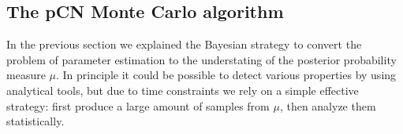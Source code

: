 \documentclass[8pt]{article}
\begin{document}

\subsection{The pCN Monte Carlo algorithm}
In the previous section we explained the Bayesian strategy to convert
the problem of parameter estimation to
the understating of the posterior probability measure $\mu$.
In principle it could be possible to detect various properties
by using analytical tools, but due to time constraints we rely on a simple
effective strategy: first produce a large amount of samples from $\mu$,
then analyze them statistically.
\end{document}
